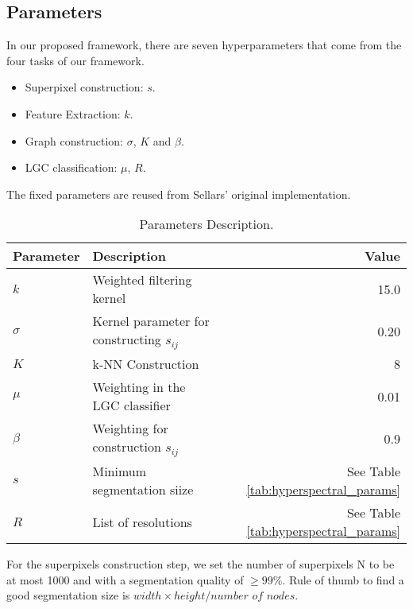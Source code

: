 \subsection{Parameters} \label{sec:parameters}

In our proposed framework, there are seven hyperparameters that come from the four tasks of our framework.
\begin{itemize}
    \item Superpixel construction: $s$.
    \item Feature Extraction: $k$.
    \item Graph construction: $\sigma$, $K$ and $\beta$.
    \item LGC classification: $\mu$, $R$.
\end{itemize}
The fixed parameters are reused from Sellars’ \citep{sellars2020} original implementation.
\begin{table}[h]
\caption{Parameters Description.}
\label{tab:fixed_parameters}
\center
\begin{tabular}{|l|l|r|}
\hline
\textbf{Parameter} & \textbf{Description} & \textbf{Value} \\
\hline
$k$ & Weighted filtering kernel & 15.0 \\
\hline
$\sigma$ & Kernel parameter for constructing $s_{ij}$ & 0.20 \\
\hline
$K$ & k-NN Construction & 8 \\
\hline
$\mu$ & Weighting in the LGC classifier & 0.01 \\
\hline
$\beta$ & Weighting for construction $s_{ij}$ & 0.9 \\
\hline
$s$ & Minimum segmentation siize & See Table \ref{tab:hyperspectral_params} \\
\hline
$R$ & List of resolutions & See Table \ref{tab:hyperspectral_params} \\
\hline
\end{tabular}
\end{table}

For the superpixels construction step, we set the number of superpixels N to be at most 1000 and with a segmentation quality of $\geq 99\%$. Rule of thumb to find a good segmentation size is $width \times height / \textit{number of nodes}$. 


